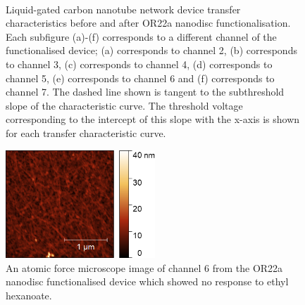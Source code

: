 \documentclass[
  a4paper,
]{scrbook}
\begin{document}
\begin{figure}
\begin{minipage}[t]{0.45\linewidth}
{{}

}

\end{minipage}%
%
\begin{minipage}[t]{0.01\linewidth}

{\centering 

~

}

\end{minipage}%

\caption{\label{fig-OR22a-variability-TX}Liquid-gated carbon nanotube
network device transfer characteristics before and after OR22a nanodisc
functionalisation. Each subfigure (a)-(f) corresponds to a different
channel of the functionalised device; (a) corresponds to channel 2, (b)
corresponds to channel 3, (c) corresponds to channel 4, (d) corresponds
to channel 5, (e) corresponds to channel 6 and (f) corresponds to
channel 7. The dashed line shown is tangent to the subthreshold slope of
the characteristic curve. The threshold voltage corresponding to the
intercept of this slope with the x-axis is shown for each transfer
characteristic curve.}

\end{figure}

\begin{figure}

{\centering \includegraphics[width=0.5\textwidth,height=\textheight]{figures/ch8/Q4C4_CH6_PostSensing_OR22a_Func_AFM100670_00693.png}

}

\caption{\label{fig-OR22a-variability-AFM}An atomic force microscope
image of channel 6 from the OR22a nanodisc functionalised device which
showed no response to ethyl hexanoate.}

\end{figure}
\end{document}
